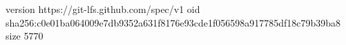 version https://git-lfs.github.com/spec/v1
oid sha256:c0e01ba064009e7db9352a631f8176e93cde1f056598a917785df18c79b39ba8
size 5770
